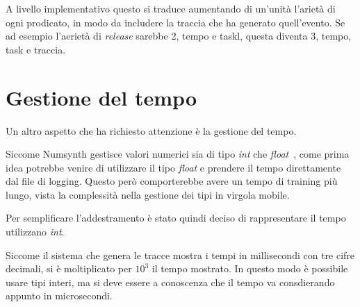 \myskip

A livello implementativo questo si traduce aumentando di un'unità l'arietà di ogni prodicato, in modo da includere la traccia che ha generato quell'evento. Se ad esempio l'aerietà di \textit{release} sarebbe 2, tempo e taskl, questa diventa 3, tempo, task e traccia.

\section{Gestione del tempo}
Un altro aspetto che ha richiesto attenzione è la gestione del tempo.

Siccome Numsynth gestisce valori numerici sia di tipo \textit{int} che \textit{float}~\cite{numsynth}, come prima idea potrebbe venire di utilizzare il tipo \textit{float} e prendere il tempo direttamente dal file di logging. Questo però comporterebbe avere un tempo di training più lungo, vista la complessità nella gestione dei tipi in virgola mobile.

\myskip

Per semplificare l'addestramento è stato quindi deciso di rappresentare il tempo utilizzano \textit{int}.

Siccome il sistema che genera le tracce mostra i tempi in millisecondi con tre cifre decimali, si è moltiplicato per $10^3$ il tempo mostrato. In questo modo è possibile usare tipi interi, ma si deve essere a conoscenza che il tempo va consdierando appunto in microsecondi.